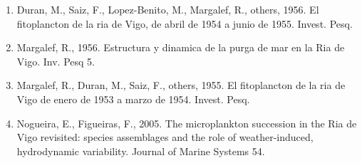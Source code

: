 \documentclass{article}
\begin{document}
\begin{enumerate}
  \item Duran, M., Saiz, F., Lopez-Benito, M., Margalef, R., others, 1956. El fitoplancton de la ria de Vigo, de abril de 1954 a junio de 1955. Invest. Pesq.
  \item Margalef, R., 1956. Estructura y dinamica de la purga de mar en la Ria de Vigo. Inv. Pesq 5.
  \item Margalef, R., Duran, M., Saiz, F., others, 1955. El fitoplancton de la ria de Vigo de enero de 1953 a marzo de 1954. Invest. Pesq.
  \item Nogueira, E., Figueiras, F., 2005. The microplankton succession in the Ria de Vigo revisited: species assemblages and the role of weather-induced, hydrodynamic variability. Journal of Marine Systems 54.
\end{enumerate}
\end{document}
